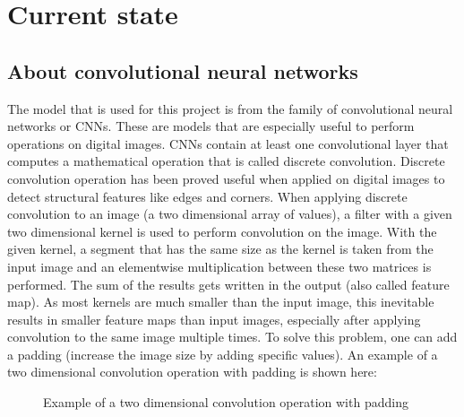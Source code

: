 \chapter{Current state}
\label{ch:currentState}

\section{About convolutional neural networks}

The model that is used for this project is from the family of convolutional neural networks or CNNs. These are models that are especially useful to perform operations on digital images. CNNs contain at least one convolutional layer that computes a mathematical operation that is called discrete convolution. Discrete convolution operation has been proved useful when applied on digital images to detect structural features like edges and corners. When applying discrete convolution to an image (a two dimensional array of values), a filter with a given two dimensional kernel is used to perform convolution on the image. With the given kernel, a segment that has the same size as the kernel is taken from the input image and an elementwise multiplication between these two matrices is performed. The sum of the results gets written in the output (also called feature map). As most kernels are much smaller than the input image, this inevitable results in smaller feature maps than input images, especially after applying convolution to the same image multiple times. To solve this problem, one can add a padding (increase the image size by adding specific values). An example of a two dimensional convolution operation with padding is shown here:

\begin{figure}[!h]
	\caption{\label{fig:convolution} Example of a two dimensional convolution operation with padding}
\end{figure}

